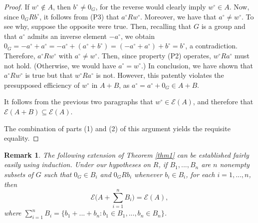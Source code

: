 \documentclass[pdflatex,sn-apa,11pt]{sn-jnl}%
\newtheorem{remark}{Remark}%
\begin{document}
\begin{proof}
If $w^{\circ} \notin A$, then $b^{\circ} \neq 0_{G}$, for the reverse would clearly imply $w^{\circ} \in A$. Now, since $0_{G} R b^{\circ}$, it follows from (P3) that $a^{\circ} R w^{\circ}$. Moreover, we have that $a^{\circ} \neq w^{\circ}$. To see why, suppose the opposite were true. Then, recalling that $G$ is a group and that $a^{\circ}$ admits an inverse element $-a^{\circ}$, we obtain $0_{G} = -a^{\circ} + a^{\circ} = -a^{\circ} + (a^{\circ} + b^{\circ}) = (-a^{\circ} + a^{\circ}) + b^{\circ} = b^{\circ}$, a contradiction. Therefore, $a^{\circ}Rw^{\circ}$ with $a^{\circ} \neq w^{\circ}$. Then, since property (P2) operates, $w^{\circ}Ra^{\circ}$ must not hold. (Otherwise, we would have $a^\circ = w^\circ$.) In conclusion, we have shown that $a^{\circ}Rw^{\circ}$ is true but that $w^{\circ}Ra^{\circ}$ is not. However, this patently violates the presupposed efficiency of $w^\circ$ in $A+B$, as $a^{\circ} = a^{\circ} + 0_{G} \in A+B$.

It follows from the previous two paragraphs that $w^{\circ} \in \mathscr{E}(A)$, and therefore that $\mathscr{E}(A+B) \subseteq \mathscr{E}(A)$.

The combination of parts (1) and (2) of this argument yields the requisite equality.
\end{proof}

\begin{remark}
\label{rem_generalized_equality}
The following extension of Theorem \ref{thm1} can be established fairly easily using induction. Under our hypotheses on $R$, if $B_1, ..., B_n$ are $n$ nonempty subsets of $G$ such that $0_{G} \in B_i$ and $0_{G}Rb_i$ whenever $b_i \in B_i$, for each $i = 1, ..., n$, then \begin{equation*}\mathscr{E}\biggl(A + \sum_{i = 1}^{n}B_i\biggr) = \mathscr{E}(A),\end{equation*}
where $\sum_{i = 1}^{n}B_i = \{b_1 + ... + b_n: b_1 \in B_1, ..., b_n \in B_n\}$. 
\end{remark}
\end{document}
